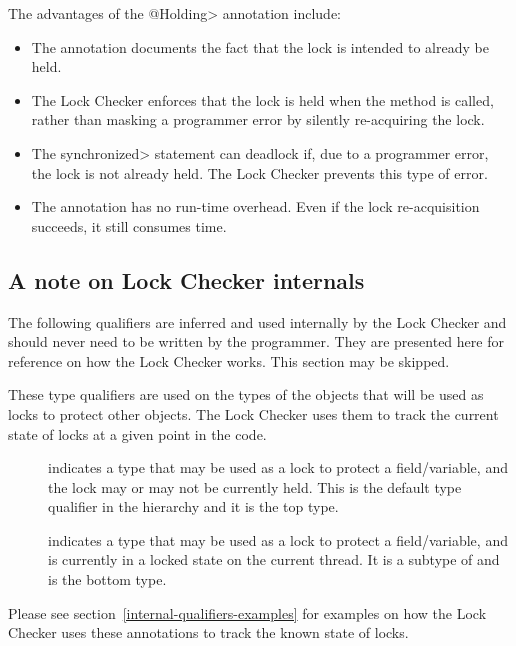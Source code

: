 The advantages of the \<@Holding> annotation include:
\begin{itemize}
\item
  The annotation documents the fact that the lock is intended to already be
  held.
\item
  The Lock Checker enforces that the lock is held when the method is
  called, rather than masking a programmer error by silently re-acquiring
  the lock.
\item
  The \<synchronized> statement can deadlock if, due to a programmer error,
  the lock is not already held.  The Lock Checker prevents this type of
  error.
\item
  The annotation has no run-time overhead.  Even if the lock re-acquisition
  succeeds, it still consumes time.
\end{itemize}

\subsection{A note on Lock Checker internals}

The following qualifiers are inferred and used internally by the Lock Checker
and should never need to be written by the programmer.  They are presented
here for reference on how the Lock Checker works.
This section may be skipped.

These type qualifiers are used on the types of the objects that will be used
as locks to protect other objects.  The Lock Checker uses them to track the
current state of locks at a given point in the code.

\begin{description}

\item[]
  indicates a type that may be used as a lock to protect a field/variable,
  and the lock may or may not be currently held. This is the default type
  qualifier in the hierarchy and it is the top type.

\item[]
  indicates a type that may be used as a lock to protect a field/variable,
  and is currently in a locked state on the current thread. It is a
  subtype of  and is the bottom type.

\end{description}

Please see section~\ref{internal-qualifiers-examples} for examples on how the Lock Checker uses these
annotations to track the known state of locks.


